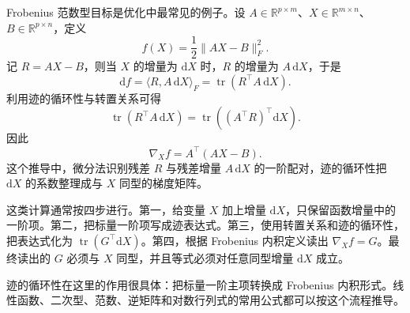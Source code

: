 Frobenius 范数型目标是优化中最常见的例子。设 \(A\in\mathbb{R}^{p\times m}\)、\(X\in\mathbb{R}^{m\times n}\)、\(B\in\mathbb{R}^{p\times n}\)，定义
\[
f(X)=\frac12\|AX-B\|_F^2.
\]
记 \(R=AX-B\)，则当 \(X\) 的增量为 \(\mathrm{d}X\) 时，\(R\) 的增量为 \(A\,\mathrm{d}X\)，于是
\[
\mathrm{d}f=\langle R,A\,\mathrm{d}X\rangle_F=\operatorname{tr}(R^\top A\,\mathrm{d}X).
\]
利用迹的循环性与转置关系可得
\[
\operatorname{tr}(R^\top A\,\mathrm{d}X)=\operatorname{tr}((A^\top R)^\top \mathrm{d}X).
\]
因此
\[
\nabla_X f=A^\top(AX-B).
\]
这个推导中，微分法识别残差 \(R\) 与残差增量 \(A\,\mathrm{d}X\) 的一阶配对，迹的循环性把 \(\mathrm{d}X\) 的系数整理成与 \(X\) 同型的梯度矩阵。

这类计算通常按四步进行。第一，给变量 \(X\) 加上增量 \(\mathrm{d}X\)，只保留函数增量中的一阶项。第二，把标量一阶项写成迹表达式。第三，使用转置关系和迹的循环性，把表达式化为 \(\operatorname{tr}(G^\top \mathrm{d}X)\)。第四，根据 Frobenius 内积定义读出 \(\nabla_X f=G\)。最终读出的 \(G\) 必须与 \(X\) 同型，并且等式必须对任意同型增量 \(\mathrm{d}X\) 成立。

迹的循环性在这里的作用很具体：把标量一阶主项转换成 Frobenius 内积形式。线性函数、二次型、范数、逆矩阵和对数行列式的常用公式都可以按这个流程推导。
